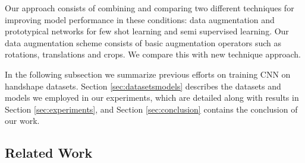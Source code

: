 Our approach consists of combining and comparing two different techniques for improving model performance in these conditions: data augmentation   and prototypical networks for few shot learning and semi supervised learning. Our data augmentation scheme consists of basic augmentation operators such as rotations, translations  and crops.  We compare this  with new technique approach.

In the following subsection we summarize previous efforts on training CNN on handshape datasets. Section \ref{sec:datasetsmodels} describes the datasets and models  we employed in our experiments,  which are detailed along with results in Section \ref{sec:experiments},  and Section \ref{sec:conclusion}  contains the conclusion of our work.

\subsection{Related Work}

